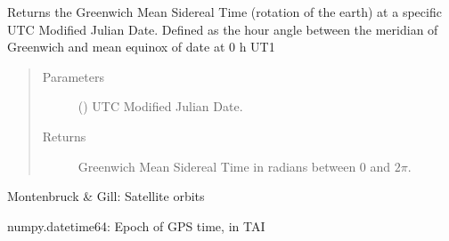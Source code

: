 \documentclass[letterpaper,10pt,english]{sphinxmanual}
\begin{document}

\begin{fulllineitems}
\label{\detokenize{modules/dpt_tools:dpt_tools.gmst}}
Returns the Greenwich Mean Sidereal Time (rotation of the earth) at a specific UTC Modified Julian Date.
Defined as the hour angle between the meridian of Greenwich and mean equinox of date at 0 h UT1
\begin{quote}\begin{description}
\item[{Parameters}] \leavevmode
{} () \textendash{} UTC Modified Julian Date.

\item[{Returns}] \leavevmode
Greenwich Mean Sidereal Time in radians between 0 and \(2\pi\).

\end{description}\end{quote}

 Montenbruck \& Gill: Satellite orbits

\end{fulllineitems}


\begin{fulllineitems}
\label{\detokenize{modules/dpt_tools:dpt_tools.gps0_tai}}
numpy.datetime64: Epoch of GPS time, in TAI

\end{fulllineitems}

\end{document}
